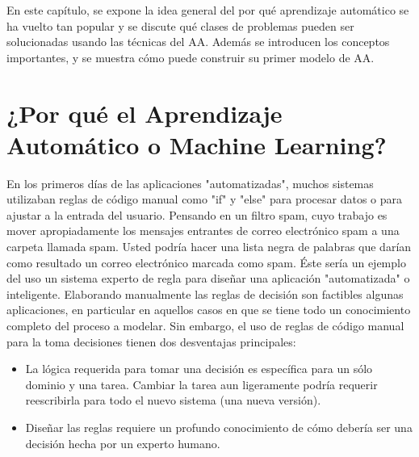  
 En este capítulo, se expone la idea general del por qué  aprendizaje automático se ha vuelto tan popular y  se  discute qué clases de problemas pueden ser solucionadas usando las técnicas del AA. Además se introducen los conceptos importantes, y se muestra  cómo puede construir su primer modelo de AA.\\

\section{¿Por qué el Aprendizaje Automático o Machine Learning? }

En los primeros días de las aplicaciones "{}automatizadas"{}, muchos sistemas utilizaban  reglas de código manual como  "{}if"{}  y  "{}else"{}  para procesar datos o para ajustar a la entrada del usuario.
Pensando en un filtro spam, cuyo trabajo es mover apropiadamente los mensajes entrantes de correo electrónico spam a una carpeta llamada spam.  Usted podría hacer una lista negra de palabras que darían como resultado un correo electrónico marcada como spam.      Éste sería un ejemplo del uso un sistema experto de regla para diseñar una aplicación "{}automatizada"{} o inteligente.   Elaborando   manualmente las reglas de decisión son  factibles  algunas aplicaciones, en particular en aquellos casos en que se  tiene todo un conocimiento completo  del proceso a modelar. Sin embargo, el uso de  reglas de código manual para la toma decisiones tienen dos desventajas principales:
 
\begin{itemize}
	
	\item La lógica requerida para tomar una decisión es específica para un sólo dominio y una tarea. Cambiar la tarea aun  ligeramente podría requerir reescribirla  para todo el nuevo sistema (una nueva versión).

   \item   Diseñar las  reglas requiere un profundo conocimiento de cómo debería ser una decisión hecha por un experto humano.

\end{itemize}


